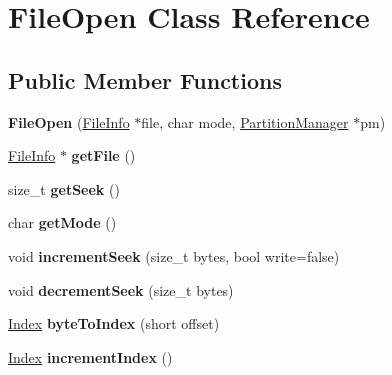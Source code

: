 \hypertarget{classFileOpen}{}\section{File\+Open Class Reference}
\label{classFileOpen}
\subsection*{Public Member Functions}
\begin{DoxyCompactItemize}
\item 
\mbox{\label{classFileOpen_a387c8980a812856a3633ff162c1c1af4}} 
{\bfseries File\+Open} (\mbox{\hyperlink{classFileInfo}{File\+Info}} $\ast$file, char mode, \mbox{\hyperlink{classPartitionManager}{Partition\+Manager}} $\ast$pm)
\item 
\mbox{\label{classFileOpen_a811022e6d3aeb87197f606f96ea48b4d}} 
\mbox{\hyperlink{classFileInfo}{File\+Info}} $\ast$ {\bfseries get\+File} ()
\item 
\mbox{\label{classFileOpen_a04e80a75040ac13609bbc05854ba4627}} 
size\+\_\+t {\bfseries get\+Seek} ()
\item 
\mbox{\label{classFileOpen_a2e0be6fcbcabe3b84c494aa3686d0a53}} 
char {\bfseries get\+Mode} ()
\item 
\mbox{\label{classFileOpen_a613c5b8b0fb9e82419c00577f19afd47}} 
void {\bfseries increment\+Seek} (size\+\_\+t bytes, bool write=false)
\item 
\mbox{\label{classFileOpen_ab66bfe7c36a52078a06ea48643bdcbdf}} 
void {\bfseries decrement\+Seek} (size\+\_\+t bytes)
\item 
\mbox{\label{classFileOpen_ace2f20f95830ff64e7da5806b856a01e}} 
\mbox{\hyperlink{structindex}{Index}} {\bfseries byte\+To\+Index} (short offset)
\item 
\mbox{\label{classFileOpen_acf54611ade567a58ea0078e24e2d245a}} 
\mbox{\hyperlink{structindex}{Index}} {\bfseries increment\+Index} ()
\item 
\mbox{\label{classFileOpen_aa98c19c8afed7c9b5942ce4e63fc7879}} 

\end{DoxyCompactItemize}
